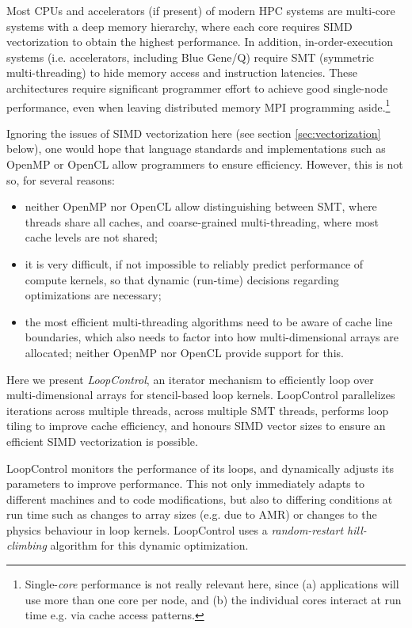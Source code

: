 \documentclass[conference]{IEEEtran}
\begin{document}
Most CPUs and accelerators (if present) of modern HPC
systems are multi-core systems with a deep memory hierarchy, where
each core requires SIMD vectorization to obtain the highest
performance. In addition, in-order-execution systems (i.e.
accelerators, including Blue Gene/Q) require SMT (symmetric
multi-threading) to hide memory access and instruction latencies.
These architectures require significant programmer effort to achieve
good single-node performance, even when leaving distributed memory MPI
programming aside.\footnote{Single-\emph{core} performance is not really relevant here,
  since (a) applications will use more than one core per node, and (b)
  the individual cores interact at run time e.g. via cache access
  patterns.}

Ignoring the issues of SIMD vectorization here (see section
\ref{sec:vectorization} below), one would hope that language standards
and implementations such as OpenMP or OpenCL allow programmers
to ensure efficiency. However, this is not so, for several reasons:
\begin{itemize}
  \item neither OpenMP nor OpenCL allow distinguishing between SMT,
    where threads share all caches, and coarse-grained multi-threading,
    where most cache levels are not shared;
  \item it is very difficult, if not impossible to reliably predict
    performance of compute kernels, so that dynamic (run-time)
    decisions regarding optimizations are necessary;
  \item the most efficient multi-threading algorithms need to be aware
    of cache
    line boundaries, which also needs to factor into how
    multi-dimensional arrays are allocated; neither OpenMP nor OpenCL
    provide support for this.
\end{itemize}

Here we present \emph{LoopControl}, an iterator mechanism to
efficiently loop over multi-dimensional arrays for stencil-based loop
kernels. LoopControl parallelizes iterations across multiple
threads, across multiple SMT threads, performs loop
tiling to improve cache efficiency, and honours SIMD vector sizes to
ensure an efficient SIMD vectorization is possible.

LoopControl monitors the performance of
its loops, and dynamically adjusts its parameters to improve
performance. This not only immediately adapts to different machines
and to code
modifications, but also to differing conditions at run time such as
changes to array sizes (e.g. due to AMR) or changes to the physics
behaviour in loop kernels. LoopControl uses a \emph{random-restart
  hill-climbing} algorithm for this dynamic optimization.
\end{document}

